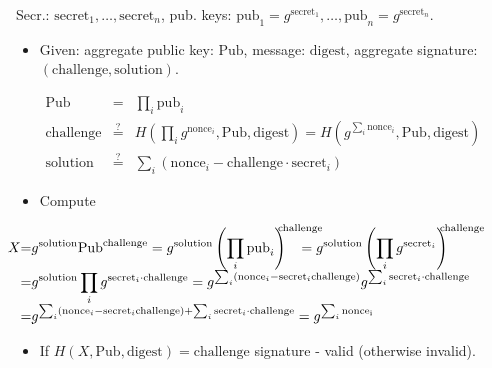 \begin{frame}
Secr.: $\mathrm{secret}_1, \dots, \mathrm{secret}_n$, pub. keys: $\mathrm{pub}_1 = g^{ \mathrm{secret }_1 }, \dots, \mathrm{pub}_n= g^{\mathrm{secret}_n}$.

\begin{emptyTheorem}
\begin{itemize}
\item Given: aggregate public key: $\mathrm{Pub} $, message: $\mathrm{digest}$, aggregate signature: $(\mathrm{challenge}, \mathrm{solution})$.

\vskip -0.25cm
\hfil\hfil$
\begin{array}{rcl}
\mathrm{Pub}&=& \prod_i \mathrm{pub}_i\\
\mathrm{challenge} &\stackrel{?}{=}& H\left( \prod_i g^{\mathrm{nonce}_i}, \mathrm{Pub}, \mathrm{digest} \right) = H\left( g^{\sum_i \mathrm{nonce}_i}, \mathrm{Pub}, \mathrm{digest} \right)  \\
\mathrm{solution} &\stackrel{?}{=}& \sum _i \left(\mathrm{nonce}_i - \mathrm{challenge}\cdot \mathrm{secret}_i \right)
\end{array}
$
\item Compute

\noindent $\hskip -1cm
\begin{array}{r@{}c@{}l} 
X&=&\displaystyle g^{\mathrm{solution} } \mathrm{Pub}^{\mathrm{challenge}}=\displaystyle g^{\mathrm{solution}} \left(\prod_i \mathrm{pub}_i\right)^{\!\!\!\!\mathrm{challenge}} 
\!\!\!\!\!\!\!\!\!\!\! =\displaystyle  g^{\mathrm{solution}} \left(\prod_i g^{\mathrm{secret}_i}\right)^{\!\!\!\!\mathrm{challenge}}\\
&=&\displaystyle g^{\mathrm{solution}}\prod_i g^{\mathrm{secret}_i\cdot \mathrm{challenge}}= \displaystyle g^{\sum_i \left(\mathrm{nonce}_i - \mathrm{secret}_i\mathrm{challenge}\right)} g^ { \sum_i \mathrm{secret}_i\cdot \mathrm{challenge} }\\
&=&\displaystyle g^{\sum_i \left(\mathrm{nonce}_i - \mathrm{secret}_i\mathrm{challenge}\right)+ \sum_i \mathrm{secret}_i\cdot \mathrm{challenge} }=g^{\sum_i\mathrm{nonce_i}}
\end{array}
$
\item If $H\left(X, \mathrm{Pub}, \mathrm{digest}\right) = \mathrm{challenge}$  signature - valid (otherwise invalid).
\end{itemize}
\end{emptyTheorem}

\vskip 15cm
\end{frame}